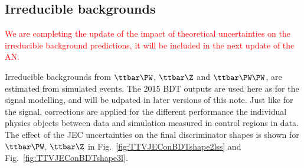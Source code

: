 \subsection{Irreducible backgrounds}

\textcolor{red}{We are completing the update of the impact of theoretical uncertainties on the irreducible background predictions, it will be included in the next update of the AN.}

Irreducible backgrounds from $\ttbar\PW$, $\ttbar\Z$ and $\ttbar\PW\PW$, are estimated from
simulated events. The 2015 BDT outputs are used here as for the signal modelling,
and will be udpated in later versions of this note.
Just like for the signal, corrections are applied for the different performance
the individual physics objects between data and simulation measured in
control regions in data. The effect of the JEC uncertainties on the
final discriminator shapes is shown for $\ttbar\PW$, $\ttbar\Z$ in Fig.~\ref{fig:TTVJEConBDTshape2lss} and Fig.~\ref{fig:TTVJEConBDTshape3l}.

